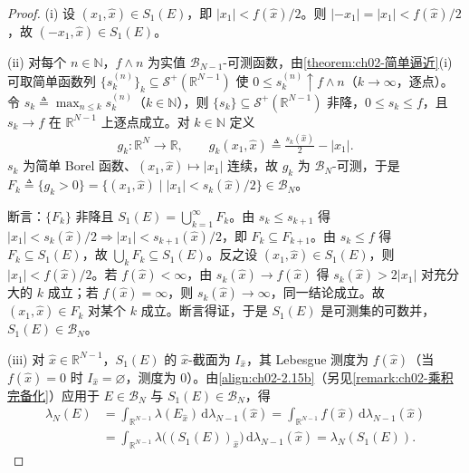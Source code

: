 \documentclass[../../main.tex]{subfiles}%
\begin{document}
\begin{proof}
(i) 设 $(x_1,\hat x)\in S_1(E)$，即 $|x_1|<f(\hat x)/2$。则 $|-x_1|=|x_1|<f(\hat x)/2$，故 $(-x_1,\hat x)\in S_1(E)$。

(ii) 对每个 $n\in\mathbb N$，$f\wedge n$ 为实值 $\mathscr B_{N-1}$-可测函数，由\cref{theorem:ch02-简单逼近}(i) 可取简单函数列 $\{s_k^{(n)}\}_k\subseteq\mathscr S^+(\mathbb R^{N-1})$ 使 $0\leqslant s_k^{(n)}\uparrow f\wedge n$（$k\to\infty$，逐点）。令 $s_k\triangleq\max_{n\leqslant k}s_k^{(n)}$（$k\in\mathbb N$），则 $\{s_k\}\subseteq\mathscr S^+(\mathbb R^{N-1})$ 非降，$0\leqslant s_k\leqslant f$，且 $s_k\to f$ 在 $\mathbb R^{N-1}$ 上逐点成立。对 $k\in\mathbb N$ 定义
\begin{align*}
g_k:\mathbb R^N\to\mathbb R,\qquad g_k(x_1,\hat x)\triangleq\frac{s_k(\hat x)}2-|x_1|.
\end{align*}
$s_k$ 为简单 Borel 函数、$(x_1,\hat x)\mapsto|x_1|$ 连续，故 $g_k$ 为 $\mathscr B_N$-可测，于是 $F_k\triangleq\{g_k>0\}=\{(x_1,\hat x)\mid|x_1|<s_k(\hat x)/2\}\in\mathscr B_N$。

断言：$\{F_k\}$ 非降且 $S_1(E)=\bigcup_{k=1}^\infty F_k$。由 $s_k\leqslant s_{k+1}$ 得 $|x_1|<s_k(\hat x)/2\Rightarrow|x_1|<s_{k+1}(\hat x)/2$，即 $F_k\subseteq F_{k+1}$。由 $s_k\leqslant f$ 得 $F_k\subseteq S_1(E)$，故 $\bigcup_kF_k\subseteq S_1(E)$。反之设 $(x_1,\hat x)\in S_1(E)$，则 $|x_1|<f(\hat x)/2$。若 $f(\hat x)<\infty$，由 $s_k(\hat x)\to f(\hat x)$ 得 $s_k(\hat x)>2|x_1|$ 对充分大的 $k$ 成立；若 $f(\hat x)=\infty$，则 $s_k(\hat x)\to\infty$，同一结论成立。故 $(x_1,\hat x)\in F_k$ 对某个 $k$ 成立。断言得证，于是 $S_1(E)$ 是可测集的可数并，$S_1(E)\in\mathscr B_N$。

(iii) 对 $\hat x\in\mathbb R^{N-1}$，$S_1(E)$ 的 $\hat x$-截面为 $I_{\hat x}$，其 Lebesgue 测度为 $f(\hat x)$（当 $f(\hat x)=0$ 时 $I_{\hat x}=\varnothing$，测度为 $0$）。由\eqref{align:ch02-2.15b}（另见\cref{remark:ch02-乘积完备化}）应用于 $E\in\mathscr B_N$ 与 $S_1(E)\in\mathscr B_N$，得
\begin{align*}
\lambda_N(E)&=\int_{\mathbb R^{N-1}}\lambda(E_{\hat x})\,\mathrm{d}\lambda_{N-1}(\hat x)
=\int_{\mathbb R^{N-1}}f(\hat x)\,\mathrm{d}\lambda_{N-1}(\hat x)\\
&=\int_{\mathbb R^{N-1}}\lambda\bigl((S_1(E))_{\hat x}\bigr)\,\mathrm{d}\lambda_{N-1}(\hat x)
=\lambda_N(S_1(E)).
\end{align*}


\end{proof}
\end{document}

